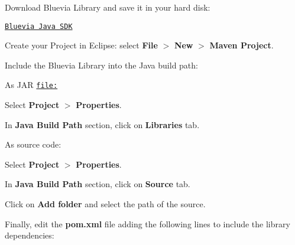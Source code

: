 \begin{DoxyEnumerate}
\item Download Bluevia Library and save it in your hard disk:

\href{http://bluevia.com/#}{\tt Bluevia Java SDK}


\item Create your Project in Eclipse: select {\bfseries File} $>$ {\bfseries New} $>$ {\bfseries Maven Project}.


\item Include the Bluevia Library into the Java build path: 
\begin{DoxyItemize}
\item As JAR \href{file:}{\tt file:} 
\begin{DoxyEnumerate}
\item Select {\bfseries Project} $>$ {\bfseries Properties}. 
\item In {\bfseries Java Build Path} section, click on {\bfseries Libraries} tab. 
\end{DoxyEnumerate}
\item As source code: 
\begin{DoxyEnumerate}
\item Select {\bfseries Project} $>$ {\bfseries Properties}. 
\item In {\bfseries Java Build Path} section, click on {\bfseries Source} tab. 
\item Click on {\bfseries Add folder} and select the path of the source. 
\end{DoxyEnumerate}
\end{DoxyItemize}
\item Finally, edit the {\bfseries pom.xml} file adding the following lines to include the library dependencies:



\end{DoxyEnumerate}
